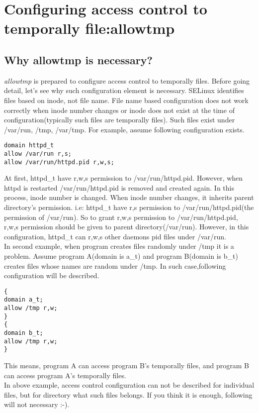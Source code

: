 \documentclass{article}
\begin{document}
\section{Configuring access control to temporally file:allowtmp}
\subsection{Why allowtmp is necessary?}
{\it allowtmp} is prepared to configure access control to temporally
files.
Before going detail, let's see why such configuration element is necessary.
SELinux identifies files based on inode, not file name. File name based
configuration does not work correctly when inode number changes or inode
does not exist at the time of configuration(typically such files are
temporally files).
Such files exist under  /var/run, /tmp, /var/tmp.
For example, assume following configuration exists.\\
\begin{verbatim}
domain httpd_t
allow /var/run r,s;
allow /var/run/httpd.pid r,w,s;
\end{verbatim}
At first, httpd\_t have r,w,s permission to /var/run/httpd.pid.
However, when httpd is restarted /var/run/httpd.pid is removed and
created again. In this process, inode number is changed. When inode
number changes, it inherits parent directory's permission. i.e:
 httpd\_t have r,s permission to /var/run/httpd.pid(the permission of
 /var/run). So to grant r,w,s permission to /var/run/httpd.pid, r,w,s
 permission should be given to parent directory(/var/run).
However, in this configuration, httpd\_t can r,w,s other daemons pid
files under /var/run. 
\\
In second example, when program creates files randomly under /tmp it is
a problem. Assume program  A(domain is a\_t) and program B(domain is
b\_t) creates files whose names are random under /tmp. In such
case,following configuration will be described.
\begin{verbatim}
{
domain a_t;
allow /tmp r,w;
}
{
domain b_t;
allow /tmp r,w;
}
\end{verbatim}
This means, program A can access program B's temporally files, and
program B can access program A's temporally files. \\
In above example, access control configuration can not be described for
individual files, but for directory what such files belongs.
If you think it is enough, following will not necessary :-).\\
\end{document}
